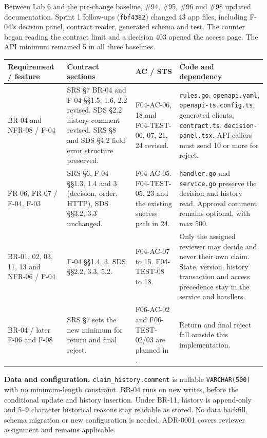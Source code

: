 Between Lab 6 and the pre-change baseline, \#94, \#95, \#96 and \#98 updated documentation. Sprint 1 follow-ups  (\texttt{fbf4382}) changed 43 app files, including F-04's decision panel, contract reader, generated schema and test. The counter began reading the contract limit and a decision 403 opened the access page. The API minimum remained 5 in all three baselines.

\clearpage
{}
\label{ev:impact}
\begin{longtable}{@{}R{2.8cm}R{4.2cm}R{3.8cm}R{5.0cm}@{}}
\toprule
\textbf{Requirement / feature} & \textbf{Contract sections} & \textbf{AC / STS} & \textbf{Code and dependency} \\ \midrule \endhead
BR-04 and NFR-08 / F-04 &
SRS \S7 BR-04 and F-04 \S\S1.5, 1.6, 2.2 revised. SDS \S2.2 history comment revised. SRS \S8 and SDS \S4.2 field error structure preserved. &
F04-AC-06, 18 and F04-TEST-06, 07, 21, 24 revised. &
\texttt{rules.go}, \texttt{openapi.yaml}, \texttt{openapi-ts.config.ts}, generated clients, \texttt{contract.ts}, \texttt{decision-panel.tsx}. API callers must send 10 or more for reject. \\
FR-06, FR-07 / F-04, F-03 &
SRS \S6, F-04 \S\S1.3, 1.4 and 3 (decision, order, HTTP), SDS \S\S3.2, 3.3 unchanged. &
F04-AC-05. F04-TEST-05, 23 and the existing success path in 24. &
\texttt{handler.go} and \texttt{service.go} preserve the decision and history read. Approval comment remains optional, with max 500. \\
BR-01, 02, 03, 11, 13 and NFR-06 / F-04 &
F-04 \S\S1.4, 3. SDS \S\S2.2, 3.3, 5.2. &
F04-AC-07 to 15. F04-TEST-08 to 18. &
Only the assigned reviewer may decide and never their own claim. State, version, history transaction and access precedence stay in the service and handlers. \\
BR-04 / later F-06 and F-08 &
SRS \S7 sets the new minimum for return and final reject. &
F06-AC-02 and F06-TEST-02/03 are planned in . &
Return and final reject fall outside this implementation. \\
\bottomrule
\end{longtable}

\textbf{Data and configuration.}
\texttt{claim\_history.comment} is nullable \texttt{VARCHAR(500)} with no minimum-length constraint. BR-04 runs on new writes, before the conditional update and history insertion. Under BR-11, history is append-only and 5--9 character historical reasons stay readable as stored. No data backfill, schema migration or new configuration is needed. ADR-0001 covers reviewer assignment and remains applicable.

